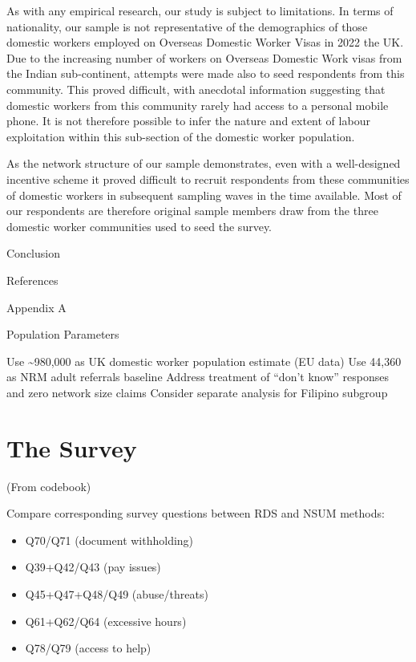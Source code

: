 \documentclass[
  12pt,
  letterpaper,
  DIV=11,
  numbers=noendperiod]{scrartcl}
\providecommand{\tightlist}{%
  \setlength{\itemsep}{0pt}\setlength{\parskip}{0pt}}
\theoremstyle{plain}
\theoremstyle{definition}
\begin{document}
As with any empirical research, our study is subject to limitations. In
terms of nationality, our sample is not representative of the
demographics of those domestic workers employed on Overseas Domestic
Worker Visas in 2022 the UK. Due to the increasing number of workers on
Overseas Domestic Work visas from the Indian sub-continent, attempts
were made also to seed respondents from this community. This proved
difficult, with anecdotal information suggesting that domestic workers
from this community rarely had access to a personal mobile phone. It is
not therefore possible to infer the nature and extent of labour
exploitation within this sub-section of the domestic worker population.

As the network structure of our sample demonstrates, even with a
well-designed incentive scheme it proved difficult to recruit
respondents from these communities of domestic workers in subsequent
sampling waves in the time available. Most of our respondents are
therefore original sample members draw from the three domestic worker
communities used to seed the survey.

Conclusion

\newpage

\newpage

\printbibliography

\newpage

References

\printbibliography[heading=none]

\newpage

\appendix

Appendix A

Population Parameters

Use \textasciitilde980,000 as UK domestic worker population estimate (EU
data) Use 44,360 as NRM adult referrals baseline Address treatment of
``don't know'' responses and zero network size claims Consider separate
analysis for Filipino subgroup

\section{The Survey}\label{the-survey}

(From codebook)

Compare corresponding survey questions between RDS and NSUM methods:

\begin{itemize}
\tightlist
\item
  Q70/Q71 (document withholding)
\item
  Q39+Q42/Q43 (pay issues)
\item
  Q45+Q47+Q48/Q49 (abuse/threats)
\item
  Q61+Q62/Q64 (excessive hours)
\item
  Q78/Q79 (access to help)
\end{itemize}
\end{document}

